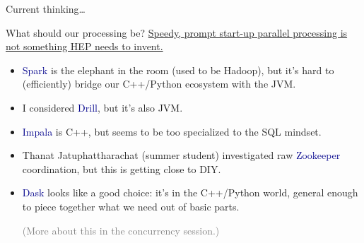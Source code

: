 \documentclass[aspectratio=169]{beamer}
\begin{document}
\begin{frame}{Current thinking\ldots}
\vspace{0.5 cm}
\begin{center}
\end{center}
\end{frame}

\begin{frame}{What should our processing be?}
\vspace{0.5 cm}
\underline{Speedy, prompt start-up parallel processing is not something HEP needs to invent.}

\vspace{0.25 cm}
\begin{itemize}\setlength{\itemsep}{0.25 cm}
\item<2-> \textcolor{darkblue}{Spark} is the elephant in the room (used to be Hadoop), but it's hard to (efficiently) bridge our C++/Python ecosystem with the JVM.

\item<3-> I considered \textcolor{darkblue}{Drill}, but it's also JVM.

\item<4-> \textcolor{darkblue}{Impala} is C++, but seems to be too specialized to the SQL mindset.

\item<5-> Thanat Jatuphattharachat (summer student) investigated raw \textcolor{darkblue}{Zookeeper} coordination, but this is getting close to DIY.

\item<6-> \textcolor{darkblue}{Dask} looks like a good choice: it's in the C++/Python world, general enough to piece together what we need out of basic parts.

\vspace{0.25 cm}
\textcolor{gray}{(More about this in the concurrency session.)}
\end{itemize}
\end{frame}
\end{document}
